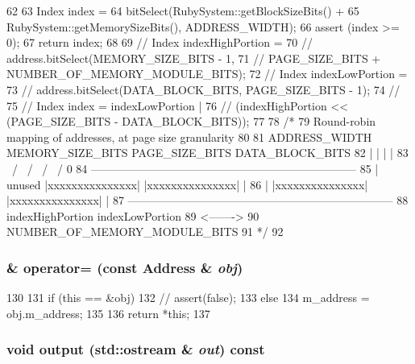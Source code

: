 \begin{DoxyCode}
62 {
63     Index index =
64         bitSelect(RubySystem::getBlockSizeBits() +
65                   RubySystem::getMemorySizeBits(), ADDRESS_WIDTH);
66     assert (index >= 0);
67     return index;
68 
69     // Index indexHighPortion =
70     //     address.bitSelect(MEMORY_SIZE_BITS - 1,
71     //                       PAGE_SIZE_BITS + NUMBER_OF_MEMORY_MODULE_BITS);
72     // Index indexLowPortion =
73     //     address.bitSelect(DATA_BLOCK_BITS, PAGE_SIZE_BITS - 1);
74     //
75     // Index index = indexLowPortion |
76     //     (indexHighPortion << (PAGE_SIZE_BITS - DATA_BLOCK_BITS));
77 
78     /*
79       Round-robin mapping of addresses, at page size granularity
80 
81 ADDRESS_WIDTH    MEMORY_SIZE_BITS        PAGE_SIZE_BITS  DATA_BLOCK_BITS
82   |                    |                       |               |
83  \ /                  \ /                     \ /             \ /       0
84   -----------------------------------------------------------------------
85   |       unused        |xxxxxxxxxxxxxxx|       |xxxxxxxxxxxxxxx|       |
86   |                     |xxxxxxxxxxxxxxx|       |xxxxxxxxxxxxxxx|       |
87   -----------------------------------------------------------------------
88                         indexHighPortion         indexLowPortion
89                                         <------->
90                                NUMBER_OF_MEMORY_MODULE_BITS
91     */
92 }
\end{DoxyCode}
\hypertarget{classAddress_aa1132891400c01bf7857fb1cf4e55a25}{
\subsubsection[{operator=}]{ \& operator= (const {\bf Address} \& {\em obj})}}
\label{classAddress_aa1132891400c01bf7857fb1cf4e55a25}



\begin{DoxyCode}
130 {
131     if (this == &obj) {
132         // assert(false);
133     } else {
134         m_address = obj.m_address;
135     }
136     return *this;
137 }
\end{DoxyCode}
\hypertarget{classAddress_ad219174fdc50e934776bd97403903d00}{
\subsubsection[{output}]{\setlength{\rightskip}{0pt plus 5cm}void output (std::ostream \& {\em out}) const}}
\label{classAddress_ad219174fdc50e934776bd97403903d00}



